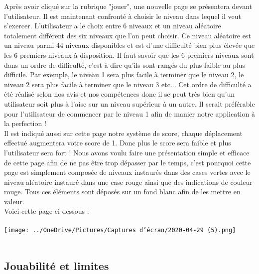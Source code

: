 \documentclass{article}
\begin{document}
Après avoir cliqué sur la rubrique "jouer", une nouvelle page se présentera devant l'utilisateur. Il est maintenant confronté à choisir le niveau dans lequel il veut s'exercer. L'utilisateur a le choix entre 6 niveaux et un niveau aléatoire totalement différent des six niveaux que l'on peut choisir. Ce niveau aléatoire est un niveau parmi 44 niveaux disponibles et est d'une difficulté bien plus élevée que les 6 premiers niveaux à disposition. 
Il faut savoir que les 6 premiers niveaux sont dans un ordre de difficulté, c'est à dire qu'ils sont rangés du plus faible au plus difficile. Par exemple, le niveau 1 sera plus facile à terminer que le niveau 2, le niveau 2 sera plus facile à terminer que le niveau 3 etc... Cet ordre de difficulté a été réalisé selon nos avis et nos compétences donc il se peut très bien qu'un utilisateur soit plus à l'aise sur un niveau supérieur à un autre. Il serait préférable pour l'utilisateur de commencer par le niveau 1 afin de manier notre application à la perfection ! \\
Il est indiqué aussi sur cette page notre système de score, chaque déplacement effectué augmentera votre score de 1. Donc plus le score sera faible et plus l'utilisateur sera fort ! 
Nous avons voulu faire une présentation simple et efficace de cette page afin de ne pas être trop dépasser par le temps, c'est pourquoi cette page est simplement composée de niveaux instaurés dans des cases vertes avec le niveau aléatoire instauré dans une case rouge ainsi que des indications de couleur rouge. Tous ces éléments sont déposés sur un fond blanc afin de les mettre en valeur. \\
Voici cette page ci-dessous : 
\\
\\
\texttt{[image: ../OneDrive/Pictures/Captures d’écran/2020-04-29 (5).png]} 
\\
\\ 
\subsection{Jouabilité et limites}
\end{document}
